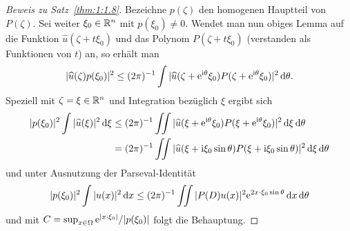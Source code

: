 \begin{proof}[Beweis zu Satz~\ref{thm:1:1.8}]
Bezeichne $p(\zeta)$ den homogenen Hauptteil von $P(\zeta)$. Sei weiter $\xi_0\in\mathbb R^n$ mit $p(\xi_0)\ne0$. Wendet man nun obiges Lemma auf die Funktion
$\widehat u(\zeta+ t\xi_0)$ und das Polynom $P(\zeta+t\xi_0)$ (verstanden als Funktionen von $t$) an, so erhält man
\begin{equation}
   |\widehat u(\zeta) p(\xi_0)|^2 \le (2\pi)^{-1} \int |\widehat u(\zeta+\mathrm e^{\mathrm i\theta} \xi_0) P(\zeta+\mathrm e^{\mathrm i\theta}\xi_0)|^2 \,\mathrm d\theta.
\end{equation}
Speziell mit $\zeta=\xi\in\mathbb R^n$ und Integration bezüglich $\xi$ ergibt sich
\begin{align}
   |p(\xi_0)|^2 \int |\widehat u(\xi)|^2 \,\mathrm d\xi &\le (2\pi)^{-1} \iint |\widehat u(\xi+\mathrm e^{\mathrm i\theta}\xi_0) P(\xi+\mathrm e^{\mathrm i\theta}\xi_0)|^2 \,\mathrm d\xi\,\mathrm d\theta \notag\\
   &= (2\pi)^{-1} \iint |\widehat u(\xi+\mathrm i\xi_0\sin\theta) P(\xi+\mathrm i\xi_0\sin\theta)|^2 \,\mathrm d\xi\,\mathrm d\theta
\end{align} 
und unter Ausnutzung der Parseval-Identität
\begin{equation}
   |p(\xi_0)|^2 \int |u(x)|^2\,\mathrm d x \le (2\pi)^{-1} \iint |P(D) u(x)|^2 \mathrm e^{2x\cdot\xi_0 \sin\theta} \,\mathrm d x\,\mathrm d\theta
\end{equation}
und mit $C=\sup_{x\in\Omega} \mathrm e^{|x\cdot\xi_0|} /|p(\xi_0)|$ folgt die Behauptung.
\end{proof}